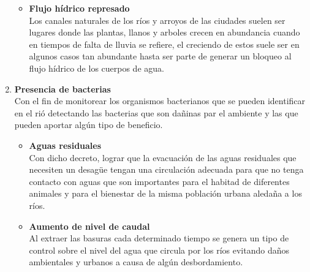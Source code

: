\begin{enumerate}
\begin{itemize}
		      \item \textbf{Flujo hídrico represado}\\
		            Los canales naturales de los ríos y arroyos de las ciudades suelen ser lugares donde las plantas, llanos y arboles crecen en abundancia cuando en tiempos de falta de lluvia se refiere, el creciendo de estos suele ser en algunos casos tan abundante hasta ser parte de generar un bloqueo al flujo hídrico de los cuerpos de agua.
	      \end{itemize}
	\item \textbf{Presencia de bacterias}\\
	      Con el fin de monitorear los organismos bacterianos que se pueden identificar en el rió detectando las bacterias que son dañinas par el ambiente y las que pueden aportar algún tipo de beneficio.
	      \begin{itemize}
		      \item \textbf{Aguas residuales} \\
		            Con dicho decreto, lograr que la evacuación de las aguas residuales que necesiten un desagüe tengan una circulación adecuada para que no tenga contacto con aguas que son importantes para el habitad de diferentes animales y para el bienestar de la misma población urbana aledaña a los ríos.
		      \item \textbf{Aumento de nivel de caudal} \\
		            Al extraer las basuras cada determinado tiempo se genera un tipo de control sobre el nivel del agua que circula por los ríos evitando daños ambientales y urbanos a causa de algún desbordamiento.


\end{itemize}
\end{enumerate}
